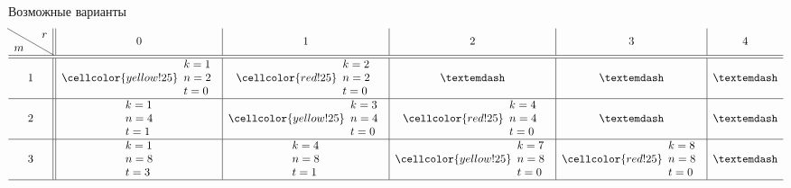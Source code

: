 \documentclass[beameroptions={aspectratio=169}]{beamerswitch}
\begin{document}
\begin{frame}{Возможные варианты}
    \[\begin{array}{c || c | c | c | c | c }
        \hbox{\diagbox{$m$}{$r$}} & 0 & 1 & 2 & 3 & 4\\
        \hline\hline
        1 & \cellcolor{yellow!25}\begin{array}{l}k=1\\ n=2\\ t=0\end{array} & %
            \cellcolor{red!25}   \begin{array}{l}k=2\\ n=2\\ t=0\end{array} & %
            — &
            — &
            — \\\hline
        2 &                      \begin{array}{l}k=1\\ n=4\\ t=1\end{array} & %
            \cellcolor{yellow!25}\begin{array}{l}k=3\\ n=4\\ t=0\end{array} & %
            \cellcolor{red!25}   \begin{array}{l}k=4\\ n=4\\ t=0\end{array} & %
            — &
            — \\\hline
        3 &                      \begin{array}{l}k=1\\ n=8\\ t=3\end{array} & %
                                 \begin{array}{l}k=4\\ n=8\\ t=1\end{array} & %
            \cellcolor{yellow!25}\begin{array}{l}k=7\\ n=8\\ t=0\end{array} & %
            \cellcolor{red!25}   \begin{array}{l}k=8\\ n=8\\ t=0\end{array} & %
            — \\\hline

\end{array}\]
\end{frame}
\end{document}
